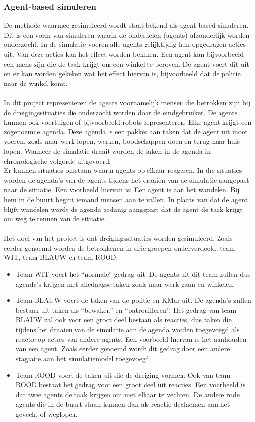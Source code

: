 \documentclass[12pt, letterpaper]{article}
\begin{document}
\subsubsection{Agent-based simuleren}
De methode waarmee gesimuleerd wordt staat bekend als agent-based simuleren. Dit is een vorm van simuleren waarin de onderdelen (agents) afzonderlijk worden onderzocht. In de simulatie voeren alle agents gelijktijdig hun opgedragen acties uit. Van deze acties kan het effect worden bekeken. Een agent kan bijvoorbeeld een mens zijn die de taak krijgt om een winkel te beroven. De agent voert dit uit en er kan worden gekeken wat het effect hiervan is, bijvoorbeeld dat de politie naar de winkel komt. \\ \\
In dit project representeren de agents voornamelijk mensen die betrokken zijn bij de dreigingssituaties die onderzocht worden door de eindgebruiker. De agents kunnen ook voertuigen of bijvoorbeeld robots representeren. Elke agent krijgt een zogenoemde agenda. Deze agenda is een pakket aan taken dat de agent uit moet voeren, zoals naar werk lopen, werken, boodschappen doen en terug naar huis lopen. Wanneer de simulatie draait worden de taken in de agenda in chronologische volgorde uitgevoerd. \\
Er kunnen situaties ontstaan waarin agents op elkaar reageren. In die situaties worden de agenda’s van de agents tijdens het draaien van de simulatie aangepast naar de situatie. Een voorbeeld hiervan is: Een agent is aan het wandelen. Bij hem in de buurt begint iemand mensen aan te vallen. In plaats van dat de agent blijft wandelen wordt de agenda zodanig aangepast dat de agent de taak krijgt om weg te rennen van de situatie. \\ \\
Het doel van het project is dat dreigingssituaties worden gesimuleerd. Zoals eerder genoemd worden de betrokkenen in drie groepen onderverdeeld: team WIT, team BLAUW en team ROOD.
\begin{itemize}
    \item Team WIT voert het “normale” gedrag uit. De agents uit dit team zullen dus agenda’s krijgen met alledaagse taken zoals naar werk gaan en winkelen.
    \item Team BLAUW voert de taken van de politie en KMar uit. De agenda’s zullen bestaan uit taken als “bewaken” en “patrouilleren”. Het gedrag van team BLAUW zal ook voor een groot deel bestaan als reacties, dus taken die tijdens het draaien van de simulatie aan de agenda worden toegevoegd als reactie op acties van andere agents. Een voorbeeld hiervan is het aanhouden van een agent. Zoals eerder genoemd wordt dit gedrag door een andere stagiaire aan het simulatiemodel toegevoegd.
    \item Team ROOD voert de taken uit die de dreiging vormen. Ook van team ROOD bestaat het gedrag voor een groot deel uit reacties. Een voorbeeld is dat twee agents de taak krijgen om met elkaar te vechten. De andere rode agents die in de buurt staan kunnen dan als reactie deelnemen aan het gevecht of weglopen.
\end{itemize}
\end{document}
